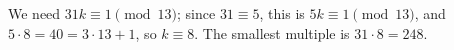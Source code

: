We need $31k\equiv1\pmod{13}$; since $31\equiv5$, this is $5k\equiv1\pmod{13}$, and $5\cdot8=40=3\cdot13+1$, so $k\equiv8$. The smallest multiple is $31\cdot8=\boxed{248}$.
